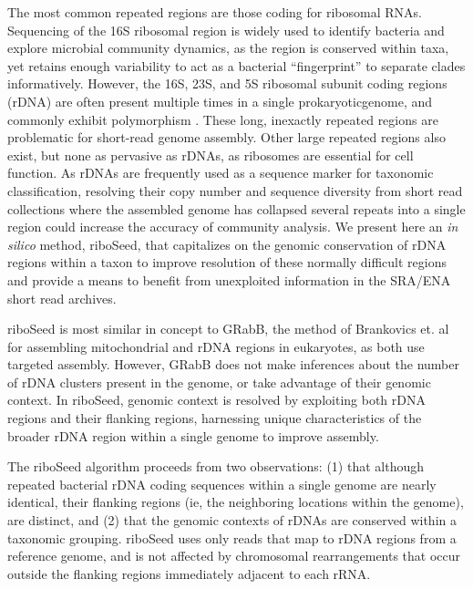 \documentclass[11pt]{article}
\begin{document}
\begin{linenumbers}
The most common repeated regions are those coding for ribosomal RNAs. Sequencing of the 16S ribosomal region is widely used to identify bacteria and explore microbial community dynamics\cite{Weisburg1991,Clarridge2004,Woese1990,Case2007}, as the region is conserved within taxa, yet retains enough variability to act as a bacterial “fingerprint” to separate clades informatively. However, the 16S, 23S, and 5S ribosomal subunit coding regions (rDNA) are often present multiple times in a single prokaryoticgenome, and commonly exhibit polymorphism \cite{Coenye2003,Moreno2002,Lukjancenko2010,Vetrovsky2013}. These long, inexactly repeated regions\cite{Alkan2011} are problematic for short-read genome assembly. Other large repeated regions also exist, but none as pervasive as rDNAs, as ribosomes are essential for cell function. As rDNAs are frequently used as a sequence marker for taxonomic classification, resolving their copy number and sequence diversity from short read collections where the assembled genome has collapsed several repeats into a single region could increase the accuracy of community analysis. We present here an \textit{in silico} method, riboSeed, that capitalizes on the genomic conservation of rDNA regions within a taxon to improve resolution of these normally difficult regions and provide a means to benefit from unexploited information in the SRA/ENA short read archives.


riboSeed is most similar in concept to GRabB, the method of Brankovics et. al \cite{Brankovics2016} for assembling mitochondrial and rDNA regions in eukaryotes, as both use targeted assembly. However, GRabB does not make inferences about the number of rDNA clusters present in the genome, or take advantage of their genomic context. In riboSeed, genomic context is resolved by exploiting both rDNA regions and their flanking regions, harnessing unique characteristics of the broader rDNA region within a single genome to improve assembly.


The riboSeed algorithm proceeds from two observations: (1) that although repeated bacterial rDNA coding sequences within a single genome are nearly identical, their flanking regions (ie, the neighboring locations within the genome), are distinct, and (2) that the genomic contexts of rDNAs  are conserved within a taxonomic grouping. riboSeed uses only reads that map to rDNA regions from a reference genome, and is not affected by chromosomal rearrangements that occur outside the flanking regions immediately adjacent to each rRNA.



\end{linenumbers}
\end{document}
